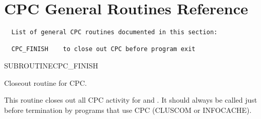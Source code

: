 \newpage
\part{CPC General Routines Reference}
\vspace*{1cm}
\begin{verbatim}
  List of general CPC routines documented in this section:

  CPC_FINISH    to close out CPC before program exit
\end{verbatim}

\begin{routine} %
\subroutine
   {SUBROUTINE}{CPC\_FINISH}{}
\begin{overview}
Closeout routine for CPC.
\end{overview}
\begin{argdeflist}
\end{argdeflist}
\begin{describe}

This routine closes out all CPC activity for \CLUSCOM and \INFOCACHE.
It should always be called just before termination by programs that
use CPC (CLUSCOM or INFOCACHE).

\end{describe}
\end{routine}

